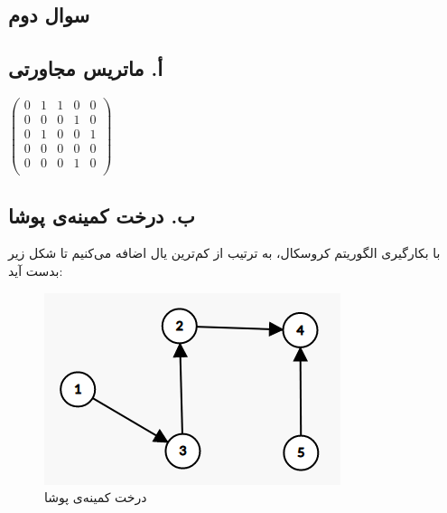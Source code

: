 \documentclass{article}
\begin{document}
\begin{multicols}{2}
\section*{سوال دوم}

\subsection*{أ. ماتریس مجاورتی }

$\begin{pmatrix}
    0&1&1&0&0\\
    0&0&0&1&0\\
    0&1&0&0&1\\
    0&0&0&0&0\\
    0&0&0&1&0\\
\end{pmatrix}$

\subsection*{ب. درخت کمینه‌ی پوشا}
با بکارگیری الگوریتم کروسکال، به ترتیب از کم‌ترین یال اضافه می‌کنیم تا شکل زیر بدست آید:
\begin{figure}[H]
    \center
    \includegraphics[width=0.8\linewidth]{Photos/HW1/mst.png}
    \caption{درخت کمینه‌ی پوشا}
    \label{fig:my_label}
\end{figure}

\end{multicols}
\end{document}
